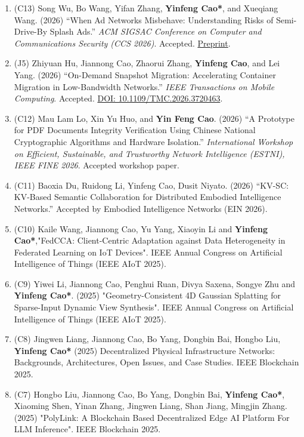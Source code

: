 \documentclass{resume}
\begin{document}
\begin{content}
\begin{enumerate}
        \item (C13) Song Wu, Bo Wang, Yifan Zhang, \textbf{Yinfeng Cao*}, and Xueqiang Wang. (2026) ``When Ad Networks Misbehave: Understanding Risks of Semi-Drive-By Splash Ads.'' \textit{ACM SIGSAC Conference on Computer and Communications Security (CCS 2026)}. Accepted. \href{https://arxiv.org/abs/2609.09574}{Preprint}.
        \item (J5) Zhiyuan Hu, Jiannong Cao, Zhaorui Zhang, \textbf{Yinfeng Cao}, and Lei Yang. (2026) ``On-Demand Snapshot Migration: Accelerating Container Migration in Low-Bandwidth Networks.'' \textit{IEEE Transactions on Mobile Computing}. Accepted. \href{https://doi.org/10.1109/TMC.2026.3720463}{DOI: 10.1109/TMC.2026.3720463}.
        \item (C12) Mau Lam Lo, Xin Yu Huo, and \textbf{Yin Feng Cao}. (2026) ``A Prototype for PDF Documents Integrity Verification Using Chinese National Cryptographic Algorithms and Hardware Isolation.'' \textit{International Workshop on Efficient, Sustainable, and Trustworthy Network Intelligence (ESTNI), IEEE FINE 2026}. Accepted workshop paper.
        \item (C11) Baoxia Du, Ruidong Li, Yinfeng Cao, Dusit Niyato. (2026) ``KV-SC: KV-Based Semantic Collaboration for Distributed Embodied Intelligence Networks.'' Accepted by Embodied Intelligence Networks (EIN 2026).
        \item (C10) Kaile Wang, Jiannong Cao, Yu Yang, Xiaoyin Li and \textbf{Yinfeng Cao*},"FedCCA: Client-Centric Adaptation against Data Heterogeneity in Federated Learning on IoT Devices". IEEE Annual Congress on Artificial Intelligence of Things (IEEE AIoT 2025).
        \item (C9) Yiwei Li, Jiannong Cao, Penghui Ruan, Divya Saxena, Songye Zhu and \textbf{Yinfeng Cao*}. (2025) "Geometry-Consistent 4D Gaussian Splatting for Sparse-Input Dynamic View Synthesis". IEEE Annual Congress on Artificial Intelligence of Things (IEEE AIoT 2025).
        \item (C8) Jingwen Liang, Jiannong Cao, Bo Yang, Dongbin Bai, Hongbo Liu, \textbf{Yinfeng Cao*} (2025) Decentralized Physical Infrastructure Networks: Backgrounds, Architectures, Open Issues, and Case Studies. IEEE Blockchain 2025.
        \item (C7) Hongbo Liu, Jiannong Cao, Bo Yang, Dongbin Bai, \textbf{Yinfeng Cao*}, Xiaoming Shen, Yinan Zhang, Jingwen Liang, Shan Jiang, Mingjin Zhang. (2025) "PolyLink: A Blockchain Based Decentralized Edge AI Platform For LLM Inference". IEEE Blockchain 2025.
        

\end{enumerate}
\end{content}
\end{document}
